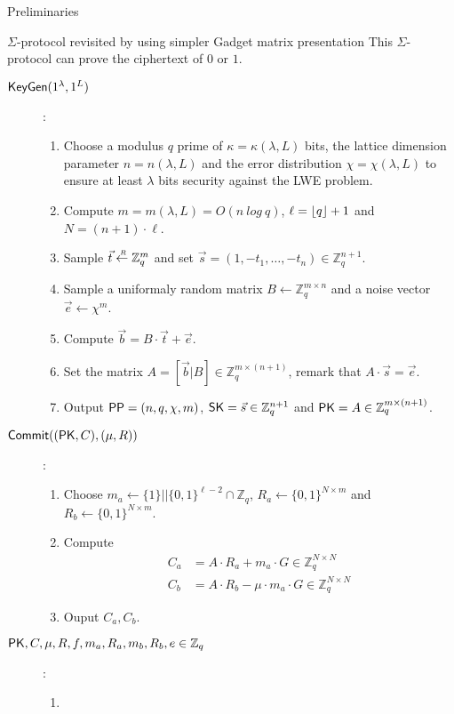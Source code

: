 \begin{section}{Preliminaries}
\begin{subsection}{$\Sigma$-protocol revisited by using simpler Gadget matrix presentation}
    This $\Sigma$-protocol can prove the ciphertext of $0$ or $1$.

    \begin{description}
    \item[${\mathsf{KeyGen}}(1^\lambda, 1^L)$]:
      \begin{enumerate}
      \item Choose a modulus $q$ prime of $\kappa = \kappa(\lambda, L)$ bits, the lattice dimension parameter $n = n(\lambda, L)$ and the error distribution $\chi = \chi(\lambda, L)$ to ensure at least $\lambda$ bits security against the LWE problem.
      \item Compute $m = m(\lambda, L) = O(n~log~q)$, $\ell = \lfloor q\rfloor+1$ and $N = (n+1) \cdot \ell$.
      \item Sample $\vec{t} \stackrel{{\scriptscriptstyle \mkern4mu R}}{\gets} \mathbb{Z}_q^m$ and set $\vec{s} = (1, -t_1, \dots, -t_n) \in \mathbb{Z}_q^{n+1}$.
      \item Sample a uniformaly random matrix $B \gets \mathbb{Z}_q^{m \times n}$ and a noise vector $\vec{e} \gets \chi^m$.
      \item Compute $\vec{b} = B \cdot \vec{t} + \vec{e}$.
      \item Set the matrix $A = [\vec{b}|B] \in \mathbb{Z}_q^{m \times (n+1)}$, remark that $A \cdot \vec{s} = \vec{e}$.
      \item Output ${\mathsf{PP}} = (n, q, \chi, m)$, $\mathsf{SK} = \vec{s} \in \mathbb{Z}_q^{n+1}$ and $\mathsf{PK} = A \in \mathbb{Z}_q^{m \times (n+1)}$.
      \end{enumerate}
    \item[${\mathsf{Commit}}((\mathsf{PK}, C), (\mu, R))$]:
      \begin{enumerate}
      \item Choose $m_a \gets \{1\}||\{0,1\}^{\ell-2} \cap \mathbb{Z}_q$, $R_a \gets \{0,1\}^{N \times m}$ and $R_b \gets \{0,1\}^{N \times m}$.
      \item Compute
        \begin{align*}
          C_a &= A\cdot R_a + m_a \cdot G \in \mathbb{Z}_q^{N \times N}\\
          C_b &= A\cdot R_b - \mu \cdot m_a \cdot G \in \mathbb{Z}_q^{N \times N}          
        \end{align*}
      \item Ouput $C_a, C_b$.
      \end{enumerate}

    \item[$\mathsf{PK}, C, \mu, R, f, m_a, R_a, m_b, R_b, e \in \mathbb{Z}_q$]:
      \begin{enumerate}
      \item 
      \end{enumerate}
      

\end{description}
\end{subsection}
\end{section}
